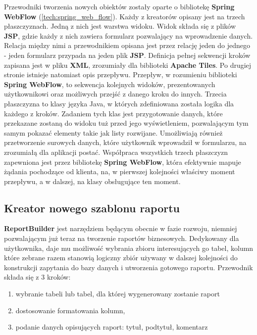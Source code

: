 Przewodniki tworzenia nowych obiektów zostały oparte o bibliotekę \textbf{Spring WebFlow} (\ref{tech:spring_web_flow}). Każdy z kreatorów opisany jest na trzech płaszczyznach. Jedną z nich jest warstwa widoku. Widok składa się z plików \textbf{JSP}, gdzie każdy z nich zawiera formularz pozwalający na wprowadzenie danych. Relacja między nimi a przewodnikiem opisana jest przez relację jeden do jednego - jeden formularz przypada na jeden plik \textbf{JSP}. Definicja pełnej sekwencji kroków zapisana jest w pliku \textbf{XML}, zrozumiały dla biblioteki \textbf{Apache Tiles}. Po drugiej stronie istnieje natomiast opis przepływu. Przepływ, w rozumieniu biblioteki \textbf{Spring WebFlow}, to sekwencja kolejnych widoków, prezentowanych użytkownikowi oraz możliwych przejść z danego kroku do innych. Trzecia płaszczyzna to klasy języka Java, w których zdefiniowana została logika dla każdego z kroków. Zadaniem tych klas jest przygotowanie danych, które przekazane zostaną do widoku tuż przed jego wyświetleniem, pozwalającym tym samym pokazać elementy takie jak listy rozwijane. Umożliwiają również przetworzenie surowych danych, które użytkownik wprowadził w formularzu, na zrozumiałą dla aplikacji postać. Współpraca wszystkich trzech płaszczyzn zapewniona jest przez bibliotekę \textbf{Spring WebFlow}, która efektywnie mapuje żądania pochodzące od klienta, na, w pierwszej kolejności właściwy moment przepływu, a w dalszej, na klasy obsługujące ten moment. 

\subsection{Kreator nowego szablonu raportu}
\label{wizard:rbuilder}
	\textbf{ReportBuilder} jest narzędziem będącym obecnie w fazie rozwoju, niemniej pozwalającym już teraz na tworzenie raportów biznesowych. Dedykowany dla użytkownika, daje mu możliwość wybrania zbioru interesujących go tabel, kolumn które zebrane razem stanowią logiczny zbiór używany w dalszej kolejności do konstrukcji zapytania do bazy danych i utworzenia gotowego raportu. Przewodnik składa się z 3 kroków:
	\begin{enumerate}
		\item wybranie tabeli lub tabel, dla której wygenerowany zostanie raport
		\item dostosowanie formatowania kolumn,
		\item podanie danych opisujących raport: tytuł, podtytuł, komentarz
	\end{enumerate}			
	
